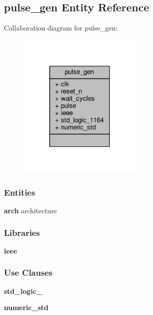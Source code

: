 \subsection{pulse\+\_\+gen Entity Reference}
\label{classpulse__gen}


Collaboration diagram for pulse\+\_\+gen\+:\nopagebreak
\begin{figure}[H]
\begin{center}
\leavevmode
\includegraphics[width=171pt]{d3/ddd/classpulse__gen__coll__graph}
\end{center}
\end{figure}
\subsubsection*{Entities}
\begin{DoxyCompactItemize}
\item 
{\bf arch} architecture
\end{DoxyCompactItemize}
\subsubsection*{Libraries}
 \begin{DoxyCompactItemize}
\item 
{\bf ieee} 
\end{DoxyCompactItemize}
\subsubsection*{Use Clauses}
 \begin{DoxyCompactItemize}
\item 
{\bf std\+\_\+logic\+\_}   
\item 
{\bf numeric\+\_\+std}   
\end{DoxyCompactItemize}
